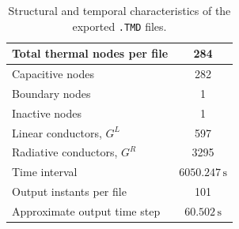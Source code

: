 \begin{table}[H]
    \centering
    \caption{Structural and temporal characteristics of the exported
        \texttt{.TMD} files.}
    \label{tab:tmd_summary}
    \small
    \setlength{\tabcolsep}{8pt}
    \renewcommand{\arraystretch}{1.15}

    \begin{tabularx}{0.76\textwidth}{|X|c|}
        \hline
        Total thermal nodes per file
        & 284 \\
        \hline

        Capacitive nodes
        & 282 \\
        \hline

        Boundary nodes
        & 1 \\
        \hline

        Inactive nodes
        & 1 \\
        \hline

        Linear conductors, \(G^{L}\)
        & 597 \\
        \hline

        Radiative conductors, \(G^{R}\)
        & 3295 \\
        \hline

        Time interval
        & \(6050.247\,\mathrm{s}\) \\
        \hline

        Output instants per file
        & 101 \\
        \hline

        Approximate output time step
        & \(60.502\,\mathrm{s}\) \\
        \hline
    \end{tabularx}
\end{table}